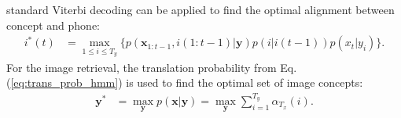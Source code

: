 \documentclass[journal]{IEEEtran}
\begin{document}


standard Viterbi decoding can be applied to find the optimal alignment between concept and phone: 
\begin{align}\label{hmm_alignment}
    i^*(t) &= \max_{1 \leq i \leq T_y}\{p(\mathbf x_{1:t-1}, i(1:t-1)|\mathbf y) p(i|i(t-1))p(x_t|y_i)\}.
\end{align}
For the image retrieval, the translation probability from Eq. (\ref{eq:trans_prob_hmm}) is used to find the optimal set of image concepts:
\begin{align*}
    \mathbf y^* &= \max_{\mathbf y} p(\mathbf x|\mathbf y) = \max_{\mathbf y} \sum_{i=1}^{T_y}\alpha_{T_x}(i).
\end{align*}
\end{document}
